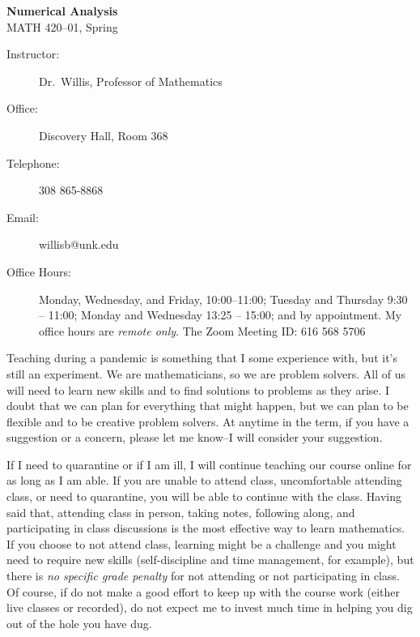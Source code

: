 \documentclass[12pt,fullpage]{article}
\newcounter{ex}\setcounter{ex}{0}
\begin{document}
\large
\begin{center}
    \textbf{Numerical Analysis}  \\
    {MATH 420--01, Spring \the\year} \\
\end{center}

\vskip0.25in
\normalsize

\begin{center}
\begin{description}
    \item[Instructor:] Dr.\  Willis, Professor of Mathematics
    \item[Office:]  Discovery Hall, Room 368
    \item[Telephone:] 308 865-8868
   \item[Email:] willisb@unk.edu
   \item[Office Hours:] Monday, Wednesday, and  Friday, \mbox{10:00--11:00}; Tuesday and Thursday 9:30 -- 11:00; Monday and Wednesday 13:25 -- 15:00;  and by appointment.  My office hours are  \emph{remote only}.  The Zoom 
Meeting ID: 616 568 5706 
\end{description}
\end{center}



\noindent Teaching during a pandemic is something that I some experience with, but it's still  an experiment.  We are mathematicians, so we are problem solvers. All of us will need to learn new skills and to find solutions to problems as they arise.  I doubt that we can plan for everything that might happen, but we can plan to be flexible and to be creative problem solvers.  At anytime in the term, if you have a suggestion or a concern, please let me know--I will consider your suggestion.

If I need to quarantine or if I am ill,  I will continue teaching our course online for as long as I am able. If you are unable to attend class, uncomfortable attending class,  or need to quarantine, you will be able to continue with the class. Having said that,  attending class in person, taking notes, following along,  and participating  in class discussions is the most effective way to learn mathematics. If you choose to not attend class,  learning might be a challenge and you might need to  require new skills (self-discipline and time management, for example), but there is \emph{no specific grade penalty} for not attending or not participating in class. Of course, if do not make a good effort to keep up with the course work (either live classes or recorded),  do not expect me to invest much time in helping you dig out of the hole you have dug.
\end{document}
